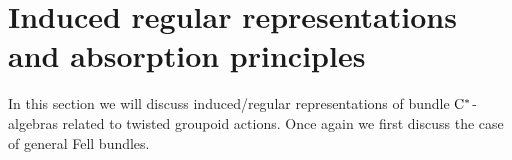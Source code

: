 \documentclass[11 pt, leqno]{amsart}
\numberwithin{equation}{section}
\theoremstyle{plain}
\theoremstyle{definition}
\newcommand*{\contc}{\mathrm{C_c}}%
\newcommand*{\contz}{\mathrm{C_0}}%
\renewcommand{\H}{\mathcal H}
\newcommand{\B}{\mathcal B}
\newcommand{\LL}{\mathcal L}
\newcommand{\G}{\mathcal G} %
\newcommand{\EE}{\mathcal E}
\newcommand{\A}{\mathcal A}
\newcommand{\cst}{\ifmmode\mathrm{C}^*\else{$\mathrm{C}^*$}\fi}
\newcommand*{\bcomment}[1]{{\color{blue}#1}}
\begin{document}



%
%
\section{Induced regular representations and absorption principles} 
\label{Sec:InducedAbsorption}

In this section we will discuss induced/regular representations of bundle $\cst$-algebras related to twisted groupoid actions. 
Once again we first discuss the case of general Fell bundles.
\end{document}
